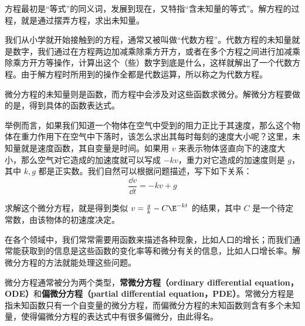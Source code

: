 

方程最初是“等式”的同义词，发展到现在，又特指“含未知量的等式”。解方程的过程，就是通过摆弄方程，求出未知量。

我们从小学就开始接触到的方程，通常又被叫做“代数方程”。代数方程的未知量就是数字，我们通过在方程两边加减乘除乘方开方，或者在多个方程之间进行加减乘除乘方开方等操作，计算出这个（些）数字到底是什么，这样就解出了一个代数方程。由于解方程时所用到的操作全都是代数运算，所以称之为代数方程。

微分方程的未知量则是函数，而方程中会涉及对这些函数求微分。解微分方程要做的是，得到具体的函数表达式。

举例而言，如果我们知道一个物体在空气中受到的阻力正比于其速度，那么这个物体在重力作用下在空气中下落时，该怎么求出其每时每刻的速度大小呢？这里，未知量就是速度函数，其自变量是时间。如果用 $v$ 来表示物体竖直向下的速度大小，那么空气对它造成的加速度就可以写成 $-kv$，重力对它造成的加速度则是 $g$，其中 $k, g$ 都是正实数。我们自然可以根据问题描述，写下如下关系：
\begin{equation}
\frac{\dd v}{\dd t}=-kv+g
\end{equation}

求解这个微分方程，就是得到类似 $v=\frac{g}{k}- C\E^{-kt}$ 的结果，其中 $C$ 是一个待定常数，由该物体的初速度决定。

在各个领域中，我们常常需要用函数来描述各种现象，比如人口的增长；而我们通常能获取到的信息是这些函数的变化率等和微分有关的信息，比如人口增长率。解微分方程的方法就能处理这些问题。

微分方程通常被分为两个类型，\textbf{常微分方程（ordinary differential equation，ODE）}和\textbf{偏微分方程（partial differential equation，PDE）}。常微分方程是指未知函数只有一个自变量的微分方程，而偏微分方程的未知函数则含有多个未知量，使得偏微分方程的表达式中有很多偏微分，由此得名。



















